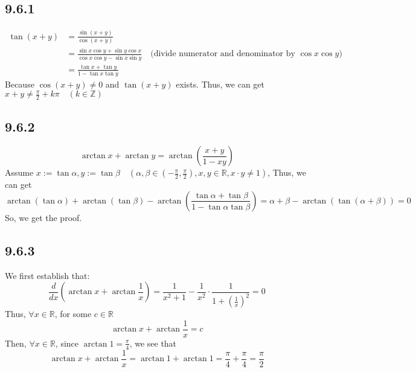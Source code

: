 \documentclass[11pt,twoside,a4paper]{article}
\begin{document}
\subsection{9.6.1}
\begin{equation}
    \begin{aligned}
    \tan (x+y)&=\frac{\sin (x+y)}{\cos (x+y)} \\
        &=  \frac{\sin x \cos y+\sin y \cos x}{\cos x \cos y-\sin x\sin y} 
        \quad\text{(divide numerator and denominator by $\cos x \cos y$)}\\
        &=\frac{\tan x+\tan y}{1-\tan x\tan y}
    \end{aligned}
\end{equation}
Because $\cos (x+y) \neq 0$ and $\tan (x+y)$ exists. Thus, we can get 
$\displaystyle x+y\neq \frac{\pi}{2}+k\pi\quad (k\in \mathbb{Z})$

\subsection{9.6.2}
$$\arctan x+\arctan y=\arctan (\frac{x+y}{1-xy})$$
Assume $\displaystyle x:=\tan \alpha ,y:=\tan \beta 
\quad (\alpha ,\beta \in (-\frac{\pi}{2},\frac{\pi}{2}),x,y\in \mathbb{R},x\cdot y \neq1)$, 
Thus, we can get 
$$
\arctan (\tan \alpha )+\arctan (\tan \beta )
-\arctan (\frac{\tan \alpha +\tan \beta }{1- \tan \alpha \tan \beta })
=\alpha +\beta -\arctan (\tan (\alpha +\beta ))=0
$$
So, we get the proof.

\subsection{9.6.3}
We first establish that:
$$
\frac{d}{dx}(\arctan x+ \arctan \frac{1}{x})=\frac{1}{x^2+1}-\frac{1}{x^2}\cdot\frac{1}{1+(\frac{1}{x})^2}=0
$$
Thus, $\forall x \in \mathbb{R}$, for some $c \in \mathbb{R}$
$$
\arctan x +\arctan\frac{1}{x}=c
$$
Then, $\forall x\in \mathbb{R}$, 
since $\displaystyle \arctan 1=\frac{\pi}{4}$, we see that
$$
\arctan x+ \arctan \frac{1}{x}=\arctan 1+ \arctan 1=\frac{\pi}{4}+\frac{\pi}{4}=\frac{\pi}{2}
$$
\end{document}
